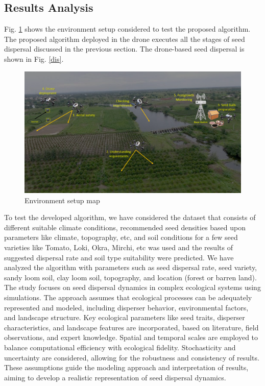 \documentclass[conference]{IEEEtran}
\begin{document}
\subsection{Results Analysis}
Fig. \ref{env} shows the environment setup considered to test the proposed algorithm. The proposed algorithm deployed in the drone executes all the stages of seed dispersal discussed in the previous section. The drone-based seed dispersal is shown in Fig. \ref{dis}.
\begin{figure}[htp]
    \centering
    \includegraphics[scale=0.2]{hornbill.png}
    \caption{Environment setup map}
    \label{env}
\end{figure}
To test the developed algorithm, we have considered the dataset that consists of different suitable climate conditions, recommended seed densities based upon parameters like climate, topography, etc, and soil conditions for a few seed varieties like Tomato, Loki, Okra, Mirchi, etc was used and the results of suggested dispersal rate and soil type suitability were predicted.
We have analyzed the algorithm with parameters such as seed dispersal rate, seed variety, sandy loom soil, clay loom soil, topography, and location (forest or barren land). 
The study focuses on seed dispersal dynamics in complex ecological systems using simulations. The approach assumes that ecological processes can be adequately represented and modeled, including disperser behavior, environmental factors, and landscape structure. Key ecological parameters like seed traits, disperser characteristics, and landscape features are incorporated, based on literature, field observations, and expert knowledge. Spatial and temporal scales are employed to balance computational efficiency with ecological fidelity. Stochasticity and uncertainty are considered, allowing for the robustness and consistency of results. These assumptions guide the modeling approach and interpretation of results, aiming to develop a realistic representation of seed dispersal dynamics.
\end{document}
